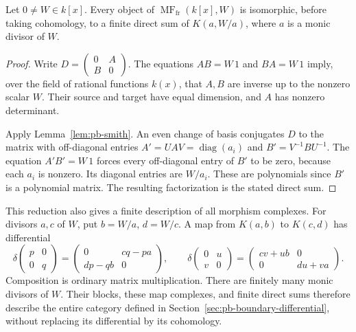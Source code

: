 \begin{theorem}
\label{thm:pb-all-ranks}
Let \(0\ne W\in k[x]\). Every object of
\(\operatorname{MF}_{\mathrm{fr}}(k[x],W)\) is isomorphic, before
taking cohomology, to a finite direct sum of \(K(a,W/a)\), where
\(a\) is a monic divisor of \(W\).
\end{theorem}
\begin{proof}
Write \(D=\left(\begin{smallmatrix}0&A\\B&0\end{smallmatrix}\right)\).
The equations \(AB=W\,1\) and \(BA=W\,1\) imply, over the field
of rational functions \(k(x)\), that \(A,B\) are inverse up to the
nonzero scalar \(W\). Their source and target have equal dimension,
and \(A\) has nonzero determinant.

Apply Lemma~\ref{lem:pb-smith}. An even change of basis conjugates
\(D\) to the matrix with off-diagonal entries
\(A'=UAV=\operatorname{diag}(a_i)\) and
\(B'=V^{-1}BU^{-1}\). The equation \(A'B'=W\,1\) forces every
off-diagonal entry of \(B'\) to be zero, because each \(a_i\)
is nonzero. Its diagonal entries are \(W/a_i\). These are
polynomials since \(B'\) is a polynomial matrix. The resulting
factorization is the stated direct sum.
\end{proof}

This reduction also gives a finite description of all morphism
complexes. For divisors \(a,c\) of \(W\), put \(b=W/a\), \(d=W/c\).
A map from \(K(a,b)\) to \(K(c,d)\) has differential
\[
 \delta\begin{pmatrix}p&0\\0&q\end{pmatrix}
   =\begin{pmatrix}0&cq-pa\\dp-qb&0\end{pmatrix},
 \qquad
 \delta\begin{pmatrix}0&u\\v&0\end{pmatrix}
   =\begin{pmatrix}cv+ub&0\\0&du+va\end{pmatrix}.
\]
Composition is ordinary matrix multiplication. There are finitely
many monic divisors of \(W\). Their blocks, these map complexes, and
finite direct sums therefore describe the entire category defined
in Section~\ref{sec:pb-boundary-differential}, without replacing
its differential by its cohomology.

